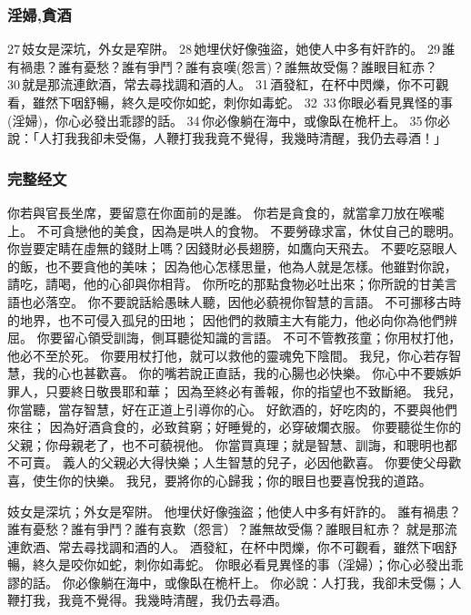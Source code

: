\subsubsection{淫婦,貪酒}
27 妓女是深坑，外女是窄阱。 28 她埋伏好像強盜，她使人中多有奸詐的。 29 誰有禍患？誰有憂愁？誰有爭鬥？誰有哀嘆(怨言)？誰無故受傷？誰眼目紅赤？ 30 就是那流連飲酒，常去尋找調和酒的人。 31 酒發紅，在杯中閃爍，你不可觀看，雖然下咽舒暢，終久是咬你如蛇，刺你如毒蛇。 32  33 你眼必看見異怪的事(淫婦)，你心必發出乖謬的話。 34 你必像躺在海中，或像臥在桅杆上。 35 你必說：「人打我我卻未受傷，人鞭打我我竟不覺得，我幾時清醒，我仍去尋酒！」


\subsubsection{完整经文}
你若與官長坐席，要留意在你面前的是誰。
你若是貪食的，就當拿刀放在喉嚨上。
不可貪戀他的美食，因為是哄人的食物。
不要勞碌求富，休仗自己的聰明。
你豈要定睛在虛無的錢財上嗎？因錢財必長翅膀，如鷹向天飛去。
不要吃惡眼人的飯，也不要貪他的美味；
因為他心怎樣思量，他為人就是怎樣。他雖對你說，請吃，請喝，他的心卻與你相背。
你所吃的那點食物必吐出來；你所說的甘美言語也必落空。
你不要說話給愚昧人聽，因他必藐視你智慧的言語。
不可挪移古時的地界，也不可侵入孤兒的田地；
因他們的救贖主大有能力，他必向你為他們辨屈。
你要留心領受訓誨，側耳聽從知識的言語。
不可不管教孩童；你用杖打他，他必不至於死。
你要用杖打他，就可以救他的靈魂免下陰間。
我兒，你心若存智慧，我的心也甚歡喜。
你的嘴若說正直話，我的心腸也必快樂。
你心中不要嫉妒罪人，只要終日敬畏耶和華；
因為至終必有善報，你的指望也不致斷絕。
我兒，你當聽，當存智慧，好在正道上引導你的心。
好飲酒的，好吃肉的，不要與他們來往；
因為好酒貪食的，必致貧窮；好睡覺的，必穿破爛衣服。
你要聽從生你的父親；你母親老了，也不可藐視他。
你當買真理；就是智慧、訓誨，和聰明也都不可賣。
義人的父親必大得快樂；人生智慧的兒子，必因他歡喜。
你要使父母歡喜，使生你的快樂。
我兒，要將你的心歸我；你的眼目也要喜悅我的道路。

妓女是深坑；外女是窄阱。
他埋伏好像強盜；他使人中多有奸詐的。
誰有禍患？誰有憂愁？誰有爭鬥？誰有哀歎（怨言）？誰無故受傷？誰眼目紅赤？
就是那流連飲酒、常去尋找調和酒的人。
酒發紅，在杯中閃爍，你不可觀看，雖然下咽舒暢，終久是咬你如蛇，刺你如毒蛇。
你眼必看見異怪的事（淫婦）；你心必發出乖謬的話。
你必像躺在海中，或像臥在桅杆上。
你必說：人打我，我卻未受傷；人鞭打我，我竟不覺得。我幾時清醒，我仍去尋酒。

